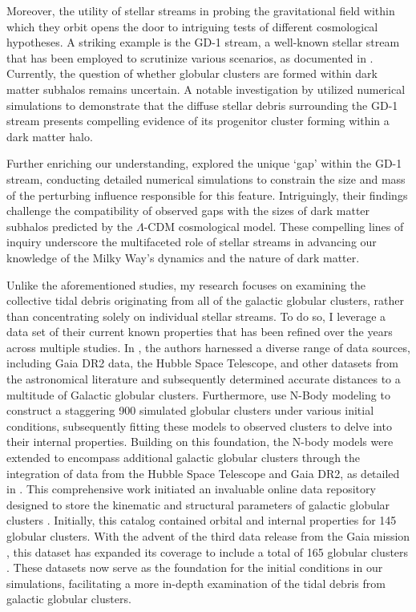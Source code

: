 Moreover, the utility of stellar streams in probing the gravitational field within which they orbit opens the door to intriguing tests of different cosmological hypotheses. A striking example is the GD-1 stream, a well-known stellar stream that has been employed to scrutinize various scenarios, as documented in \citep{2018ApJ...863L..20P}. Currently, the question of whether globular clusters are formed within dark matter subhalos remains uncertain. A notable investigation by \citet{2019ApJ...881..106M} utilized numerical simulations to demonstrate that the diffuse stellar debris surrounding the GD-1 stream presents compelling evidence of its progenitor cluster forming within a dark matter halo.

Further enriching our understanding, \citep{2021hst..prop16791B} explored the unique `gap' within the GD-1 stream, conducting detailed numerical simulations to constrain the size and mass of the perturbing influence responsible for this feature. Intriguingly, their findings challenge the compatibility of observed gaps with the sizes of dark matter subhalos predicted by the $\Lambda$-CDM cosmological model. These compelling lines of inquiry underscore the multifaceted role of stellar streams in advancing our knowledge of the Milky Way's dynamics and the nature of dark matter.


Unlike the aforementioned studies, my research focuses on examining the collective tidal debris originating from all of the galactic globular clusters, rather than concentrating solely on individual stellar streams. To do so, I leverage a data set of their current known properties that has been refined over the years across multiple studies. In \citet{2021MNRAS.505.5957B}, the authors harnessed a diverse range of data sources, including Gaia DR2 data, the Hubble Space Telescope, and other datasets from the astronomical literature and subsequently determined accurate distances to a multitude of Galactic globular clusters. Furthermore,  \citet{2017MNRAS.464.2174B} use N-Body modeling to construct a staggering 900 simulated globular clusters under various initial conditions, subsequently fitting these models to observed clusters to delve into their internal properties. Building on this foundation, the N-body models were extended to encompass additional galactic globular clusters through the integration of data from the Hubble Space Telescope and Gaia DR2, as detailed in \citet{2020IAUS..351..451H}. This comprehensive work initiated an invaluable online data repository designed to store the kinematic and structural parameters of galactic globular clusters \citep{2021yCat..74781520B}. Initially, this catalog contained orbital and internal properties for 145 globular clusters. With the advent of the third data release from the Gaia mission \citep{2021A&A...650C...3G}, this dataset has expanded its coverage to include a total of 165 globular clusters \citep{2021MNRAS.505.5978V}. These datasets now serve as the foundation for the initial conditions in our simulations, facilitating a more in-depth examination of the tidal debris from galactic globular clusters.



